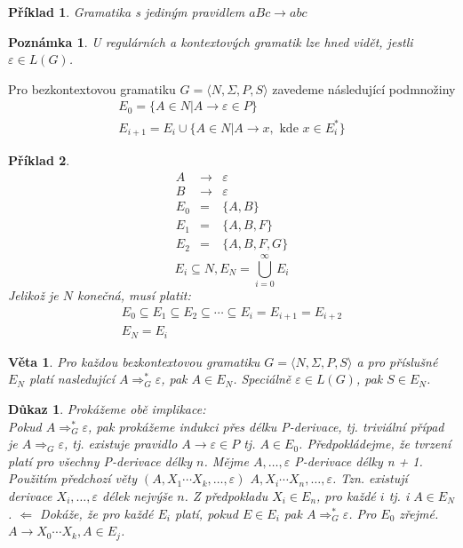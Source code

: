 \documentclass[10pt, a4paper, titlepage]{article}
\theoremstyle{note}
\newtheorem{veta}{\textbf{Věta}}
\newtheorem{dukaz}{\textbf{Důkaz}}
\newtheorem{priklad}{\textbf{Příklad}}
\newtheorem{poznamka}{\textbf{Poznámka}}
\begin{document}
\begin{priklad}
Gramatika s jediným pravidlem $aBc \rightarrow abc$
\end{priklad}

\begin{poznamka}
U regulárních a kontextových gramatik lze hned vidět, jestli $\varepsilon \in L(G)$.
\end{poznamka}

Pro bezkontextovou gramatiku $G = \langle N, \Sigma, P,S \rangle$ zavedeme následující podmnožiny
\begin{gather*}
E_{0} = \lbrace A \in N | A \rightarrow \varepsilon \in P \rbrace \\
E_{i+1} = E_{i} \cup \lbrace A \in N | A \rightarrow x, \text{ kde } x \in E_{i}^* \rbrace
\end{gather*}

\begin{priklad}
\begin{eqnarray*}
A &\rightarrow& \varepsilon \\
B &\rightarrow& \varepsilon \\
E_{0} &=& \lbrace A, B \rbrace \\
E_{1} &=& \lbrace A, B, F \rbrace \\
E_{2} &=& \lbrace A, B, F, G \rbrace
\end{eqnarray*}
$$
E_{i} \subseteq N, E_{N} = \bigcup_{i=0}^{\infty} E_{i}
$$
Jelikož je $N$ konečná, musí platit:
\begin{gather*}
E_{0} \subseteq E_{1} \subseteq E_{2} \subseteq \cdots \subseteq E_{i} = E_{i+1} = E_{i+2} \\
E_{N} = E_{i}
\end{gather*}
\end{priklad}

\begin{veta}
Pro každou bezkontextovou gramatiku $G = \langle N, \Sigma, P,S \rangle$ a pro příslušné $E_{N}$ platí nasledující $A \Rightarrow_{G}^{*}\varepsilon$, pak $A \in E_{N}$. 
Speciálně $\varepsilon \in L(G)$, pak $S \in E_{N}$.
\end{veta}

\begin{dukaz}
Prokážeme obě implikace: \\
Pokud $A \Rightarrow_{G}^{*}\varepsilon$, pak prokážeme indukci přes délku P-derivace, tj. triviální případ je $A \Rightarrow_{G}\varepsilon$, 
tj. existuje pravidlo $A \rightarrow \varepsilon \in P$ tj. $A \in E_{0}$.
Předpokládejme, že tvrzení platí pro všechny P-derivace délky $n$.
Mějme $A, \ldots, \varepsilon$ P-derivace délky n + 1. Použitím předchozí věty $(A, X_{1} \cdots X_{k}, \ldots, \varepsilon)$ $A, X_{i} \cdots X_{n}, \ldots, \varepsilon$.
Tzn. existují derivace $X_{i}, \ldots, \varepsilon$ délek nejvýše $n$. Z předpokladu $X_{i} \in E_{n}$, pro každé $i$ tj. i $A \in E_{N}$. 
$\Leftarrow$ Dokáže, že pro každé $E_{i}$ platí, pokud $E \in E_{i}$ pak $A \Rightarrow_{G}^{*}\varepsilon$. Pro $E_{0}$ zřejmé.
$A \rightarrow X_{0} \cdots X_{k}, A \in E_{j}$.
\end{dukaz}
\end{document}
